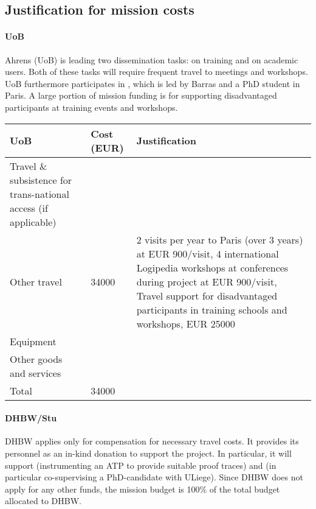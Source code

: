 \subsection*{Justification for mission costs}

\paragraph*{UoB}

Ahrens (UoB) is leading two dissemination tasks: 
 on training and 
 on academic users.
Both of these tasks will require frequent travel to meetings and workshops.
UoB furthermore participates in , which is led by Barras and a PhD student in Paris. A large portion of mission funding is for supporting disadvantaged participants at training events and workshops.

\noindent
\begin{tabular}{|p{9em}|l|p{}|}
\hline
  UoB & Cost (EUR)  & Justification \\
  \hline
  Travel \& subsistence for trans-national access (if applicable) & & \\
  \hline
  Other travel & 34000 & 2 visits per year to Paris (over 3 years) at EUR 900/visit,
                         4 international Logipedia workshops at conferences during project at EUR 900/visit,
                         Travel support for disadvantaged participants in training schools and workshops, EUR 25000
  \\                         
  \hline
  Equipment & & \\
  \hline
  Other goods and services & & \\
  \hline
  \hline
  Total & 34000 & \\
  \hline
\end{tabular}


\paragraph*{DHBW/Stu}

DHBW applies only for compensation for necessary travel costs. It
provides its personnel as an in-kind donation to support the
project. In particular, it will support  (instrumenting
an ATP to provide suitable proof traces) and  (in
particular co-supervising a PhD-candidate with ULiege). Since DHBW does
not apply for any other funds, the mission budget is 100\% of the
total budget allocated to DHBW.

